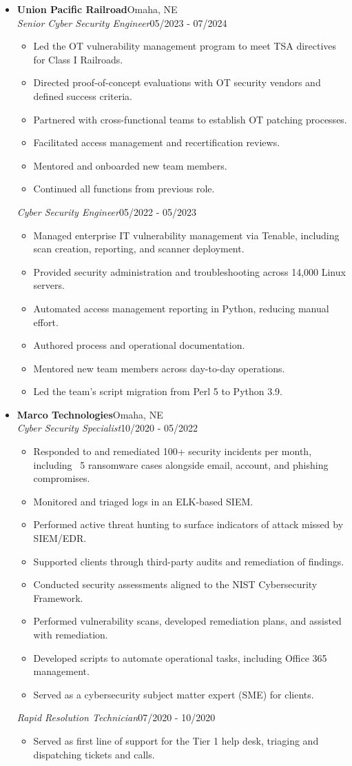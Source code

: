 \documentclass[letterpaper,9pt]{extarticle}
\newcommand{\resumeCompany}[2]{%
  \vspace{0.2em}%
  \textbf{#1}\hfill{\small\color{muted}#2}\\[0.2em]%
}
\newcommand{\resumePosition}[2]{%
  {\small\textit{#1}}\hfill{\small #2}%
}
\newcommand{\resumeItem}[1]{\item\small #1}
\begin{document}
\begin{itemize}[leftmargin=0pt, label={}, itemsep=0.35em]
  \item
  \resumeCompany{Union Pacific Railroad}{Omaha, NE}
  \resumePosition{Senior Cyber Security Engineer}{05/2023 - 07/2024}
  \begin{itemize}
    \resumeItem{Led the OT vulnerability management program to meet TSA directives for Class I Railroads.}
    \resumeItem{Directed proof-of-concept evaluations with OT security vendors and defined success criteria.}
    \resumeItem{Partnered with cross-functional teams to establish OT patching processes.}
    \resumeItem{Facilitated access management and recertification reviews.}
    \resumeItem{Mentored and onboarded new team members.}
    \resumeItem{Continued all functions from previous role.}
  \end{itemize}
  \vspace{0.25em}
  \resumePosition{Cyber Security Engineer}{05/2022 - 05/2023}
  \begin{itemize}
    \resumeItem{Managed enterprise IT vulnerability management via Tenable, including scan creation, reporting, and scanner deployment.}
    \resumeItem{Provided security administration and troubleshooting across 14,000 Linux servers.}
    \resumeItem{Automated access management reporting in Python, reducing manual effort.}
    \resumeItem{Authored process and operational documentation.}
    \resumeItem{Mentored new team members across day-to-day operations.}
    \resumeItem{Led the team's script migration from Perl 5 to Python 3.9.}
  \end{itemize}

  \item
  \resumeCompany{Marco Technologies}{Omaha, NE}
  \resumePosition{Cyber Security Specialist}{10/2020 - 05/2022}
  \begin{itemize}
    \resumeItem{Responded to and remediated 100+ security incidents per month, including ~5 ransomware cases alongside email, account, and phishing compromises.}
    \resumeItem{Monitored and triaged logs in an ELK-based SIEM.}
    \resumeItem{Performed active threat hunting to surface indicators of attack missed by SIEM/EDR.}
    \resumeItem{Supported clients through third-party audits and remediation of findings.}
    \resumeItem{Conducted security assessments aligned to the NIST Cybersecurity Framework.}
    \resumeItem{Performed vulnerability scans, developed remediation plans, and assisted with remediation.}
    \resumeItem{Developed scripts to automate operational tasks, including Office 365 management.}
    \resumeItem{Served as a cybersecurity subject matter expert (SME) for clients.}
  \end{itemize}
  \vspace{0.25em}
  \resumePosition{Rapid Resolution Technician}{07/2020 - 10/2020}
  \begin{itemize}
    \resumeItem{Served as first line of support for the Tier 1 help desk, triaging and dispatching tickets and calls.}
  \end{itemize}


\end{itemize}
\end{document}
